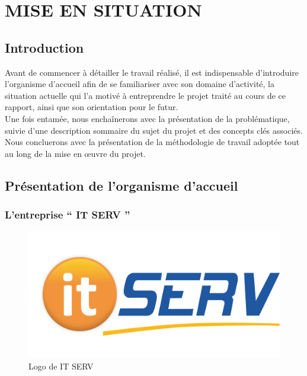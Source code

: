 
\setcounter{mtc}{3} %
\chapter{          MISE EN SITUATION}
\minitoc  %

\graphicspath{{Chapitre1/figures/}}
\pagestyle{fancy}
\fancyhf{}
\fancyhead[R]{\bfseries\rightmark}
\fancyfoot[R]{\thepage}
\renewcommand{\headrulewidth}{0.5pt}
\renewcommand{\footrulewidth}{0pt}
\renewcommand{\chaptermark}[1]{\markboth{\MakeUppercase{\chaptername~\thechapter. #1 }}{}}
\renewcommand{\sectionmark}[1]{\markright{\thechapter.\thesection~ #1}}

\begin{spacing}{1.5}

\section*{Introduction}
Avant de commencer à détailler le travail réalisé, il est indispensable d'introduire l'organisme d'accueil afin de se familiariser avec son domaine d'activité, la situation actuelle qui l'a motivé à entreprendre le projet traité au cours de ce rapport, ainsi que son orientation pour le futur.\\
Une fois entamée, nous enchaînerons avec la présentation de la problématique, suivie d'une description sommaire du sujet du projet et des concepts clés associés. Nous concluerons avec la présentation de la méthodologie de travail adoptée tout au long de la mise en œuvre du projet.


\section{Présentation de l'organisme d'accueil}

\subsection{L'entreprise “ IT SERV ”}

\begin{figure}[h]
\centering
\includegraphics[width=0.3\linewidth]{logoITSERV.png}
\caption{Logo de IT SERV}
\label{fig:logoITSERV}
\end{figure}


\end{spacing}
